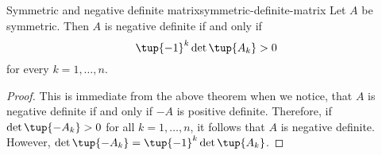 \begin{corollary}{Symmetric and negative definite matrix}{symmetric-definite-matrix} %
Let $A$ be symmetric. Then $A$ is negative definite if and only
if 
\begin{equation*}
\tup{-1} ^{k} \det \tup{A_{k}} >0
\end{equation*}
for every $k=1,\ldots,n$.
\end{corollary}

\begin{proof}This is immediate from the above theorem when we notice,
that $A$ is negative definite if and only if $-A$ is positive definite.
Therefore, if $\det \tup{-A_{k}} >0$ for all $k=1,\ldots,n$, it
follows that $A$ is negative definite. However, $\det \tup{-A_{k}}
=\tup{-1} ^{k}\det \tup{A_{k}}$. 
\end{proof}
